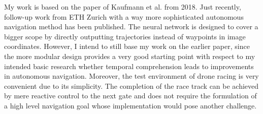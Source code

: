 My work is based on the paper of Kaufmann et al. \cite{Kaufmann2018} from 2018.
Just recently, follow-up work from ETH Zurich \cite{Loquercio2021Science} with 
a way more sophisticated autonomous navigation method has been published. 
The neural network is designed to cover a bigger scope
by directly outputting trajectories instead of waypoints in image coordinates.
However, I intend to still base my work on the earlier paper,
since the more modular design provides a very good starting point with respect to my intended basic research
whether temporal comprehension leads to improvements in autonomous navigation.
Moreover, the test environment of drone racing is very convenient due to its simplicity.
The completion of the race track can be achieved by mere reactive control to the next gate
and does not require the formulation of a high level navigation goal
whose implementation would pose another challenge.





%


